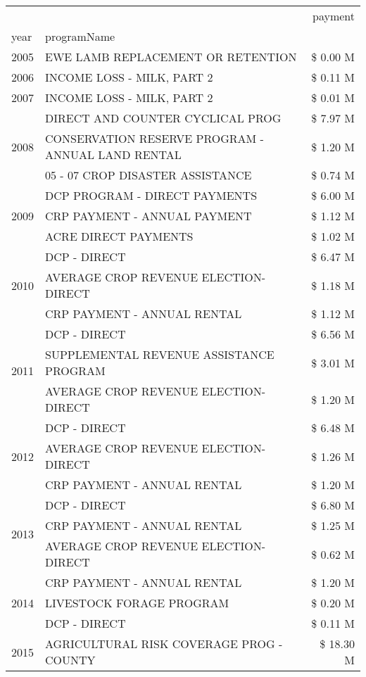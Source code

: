 \begin{tabular}{llr}
\toprule
 &  & payment \\
year & programName &  \\
\midrule
2005 & EWE LAMB REPLACEMENT OR RETENTION & \$ 0.00 M \\
\cline{1-3}
2006 & INCOME LOSS - MILK, PART 2 & \$ 0.11 M \\
\cline{1-3}
2007 & INCOME LOSS - MILK, PART 2 & \$ 0.01 M \\
\cline{1-3}
\multirow[t]{3}{*}{2008} & DIRECT AND COUNTER CYCLICAL PROG & \$ 7.97 M \\
 & CONSERVATION RESERVE PROGRAM - ANNUAL LAND RENTAL & \$ 1.20 M \\
 & 05 - 07 CROP DISASTER ASSISTANCE & \$ 0.74 M \\
\cline{1-3}
\multirow[t]{3}{*}{2009} & DCP PROGRAM - DIRECT PAYMENTS & \$ 6.00 M \\
 & CRP PAYMENT - ANNUAL PAYMENT & \$ 1.12 M \\
 & ACRE DIRECT PAYMENTS & \$ 1.02 M \\
\cline{1-3}
\multirow[t]{3}{*}{2010} & DCP - DIRECT & \$ 6.47 M \\
 & AVERAGE CROP REVENUE ELECTION-DIRECT & \$ 1.18 M \\
 & CRP PAYMENT - ANNUAL RENTAL & \$ 1.12 M \\
\cline{1-3}
\multirow[t]{3}{*}{2011} & DCP - DIRECT & \$ 6.56 M \\
 & SUPPLEMENTAL REVENUE ASSISTANCE PROGRAM & \$ 3.01 M \\
 & AVERAGE CROP REVENUE ELECTION-DIRECT & \$ 1.20 M \\
\cline{1-3}
\multirow[t]{3}{*}{2012} & DCP - DIRECT & \$ 6.48 M \\
 & AVERAGE CROP REVENUE ELECTION-DIRECT & \$ 1.26 M \\
 & CRP PAYMENT - ANNUAL RENTAL & \$ 1.20 M \\
\cline{1-3}
\multirow[t]{3}{*}{2013} & DCP - DIRECT & \$ 6.80 M \\
 & CRP PAYMENT - ANNUAL RENTAL & \$ 1.25 M \\
 & AVERAGE CROP REVENUE ELECTION-DIRECT & \$ 0.62 M \\
\cline{1-3}
\multirow[t]{3}{*}{2014} & CRP PAYMENT - ANNUAL RENTAL & \$ 1.20 M \\
 & LIVESTOCK FORAGE PROGRAM & \$ 0.20 M \\
 & DCP - DIRECT & \$ 0.11 M \\
\cline{1-3}
\multirow[t]{3}{*}{2015} & AGRICULTURAL RISK COVERAGE PROG - COUNTY & \$ 18.30 M \\

\end{tabular}
